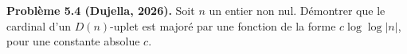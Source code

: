 \textbf{Problème 5.4 (Dujella, 2026).} Soit $n$ un entier non nul. Démontrer que le cardinal d'un $D(n)$-uplet est majoré par une fonction de la forme $c\log\log|n|$, pour une constante absolue $c$.
